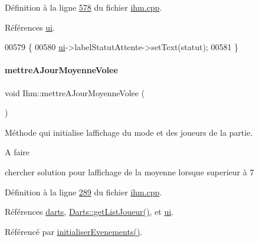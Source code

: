 Définition à la ligne \hyperlink{ihm_8cpp_source_l00578}{578} du fichier \hyperlink{ihm_8cpp_source}{ihm.\+cpp}.



Références \hyperlink{ihm_8h_source_l00052}{ui}.


\begin{DoxyCode}
00579 \{
00580     \hyperlink{class_ihm_a0ac5f47856566ceeeca1720109bf70ea}{ui}->labelStatutAttente->setText(statut);
00581 \}
\end{DoxyCode}
\mbox{\label{class_ihm_abafc4398a910be8ab95a75fbdf176426}} 
\paragraph{\texorpdfstring{mettre\+A\+Jour\+Moyenne\+Volee}{mettreAJourMoyenneVolee}}
{\footnotesize\ttfamily void Ihm\+::mettre\+A\+Jour\+Moyenne\+Volee (\begin{DoxyParamCaption}{ }\end{DoxyParamCaption})\hspace{0.3cm}{\ttfamily [slot]}}



Méthode qui initialise l\textquotesingle{}affichage du mode et des joueurs de la partie. 

\begin{DoxyRefDesc}{A faire}
\item[\hyperlink{todo__todo000001}{A faire}]chercher solution pour l\textquotesingle{}affichage de la moyenne lorsque superieur à 7 \end{DoxyRefDesc}


Définition à la ligne \hyperlink{ihm_8cpp_source_l00289}{289} du fichier \hyperlink{ihm_8cpp_source}{ihm.\+cpp}.



Références \hyperlink{ihm_8h_source_l00055}{darts}, \hyperlink{darts_8cpp_source_l00055}{Darts\+::get\+List\+Joueur()}, et \hyperlink{ihm_8h_source_l00052}{ui}.



Référencé par \hyperlink{ihm_8cpp_source_l00075}{initialiser\+Evenements()}.


